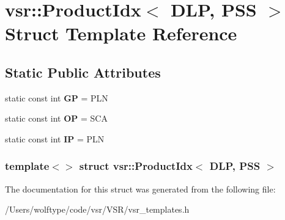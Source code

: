 \hypertarget{structvsr_1_1_product_idx_3_01_d_l_p_00_01_p_s_s_01_4}{\section{vsr\-:\-:Product\-Idx$<$ D\-L\-P, P\-S\-S $>$ Struct Template Reference}
\label{structvsr_1_1_product_idx_3_01_d_l_p_00_01_p_s_s_01_4}
}
\subsection*{Static Public Attributes}
\begin{DoxyCompactItemize}
\item 
\hypertarget{structvsr_1_1_product_idx_3_01_d_l_p_00_01_p_s_s_01_4_ab3f1438b803259865b843f7085f1c80c}{static const int {\bfseries G\-P} = P\-L\-N}\label{structvsr_1_1_product_idx_3_01_d_l_p_00_01_p_s_s_01_4_ab3f1438b803259865b843f7085f1c80c}

\item 
\hypertarget{structvsr_1_1_product_idx_3_01_d_l_p_00_01_p_s_s_01_4_a907861b26632ce556c06061926491b20}{static const int {\bfseries O\-P} = S\-C\-A}\label{structvsr_1_1_product_idx_3_01_d_l_p_00_01_p_s_s_01_4_a907861b26632ce556c06061926491b20}

\item 
\hypertarget{structvsr_1_1_product_idx_3_01_d_l_p_00_01_p_s_s_01_4_afbc5dff5b298b2e18eb247647c6dd4fa}{static const int {\bfseries I\-P} = P\-L\-N}\label{structvsr_1_1_product_idx_3_01_d_l_p_00_01_p_s_s_01_4_afbc5dff5b298b2e18eb247647c6dd4fa}

\end{DoxyCompactItemize}
\subsubsection*{template$<$$>$ struct vsr\-::\-Product\-Idx$<$ D\-L\-P, P\-S\-S $>$}



The documentation for this struct was generated from the following file\-:\begin{DoxyCompactItemize}
\item 
/\-Users/wolftype/code/vsr/\-V\-S\-R/vsr\-\_\-templates.\-h\end{DoxyCompactItemize}
